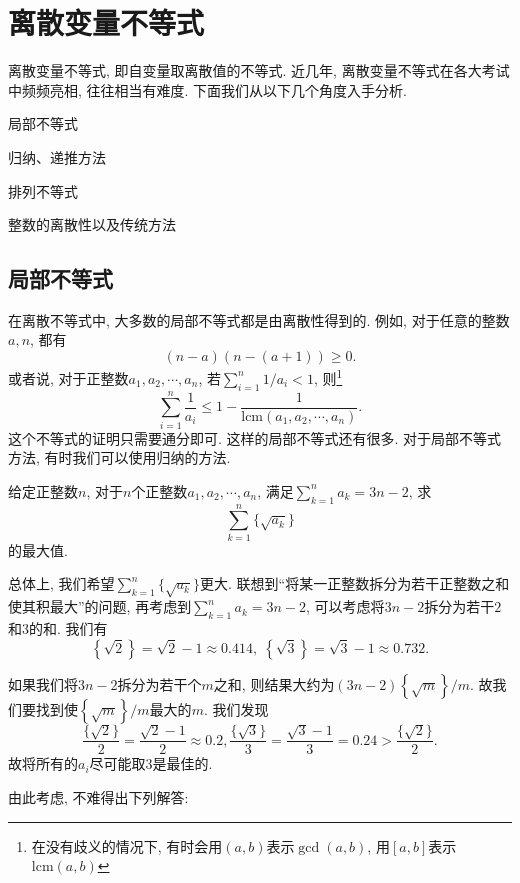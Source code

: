 \documentclass[lang=cn,12pt,thmcnt=section]{elegantbook}
\newcommand{\dec}[1]{\left\{#1\right\}}
\begin{document}
\chapter{离散变量不等式}

\setcounter{page}{1}

离散变量不等式, 即自变量取离散值的不等式. 近几年, 离散变量不等式在各大考试中频频亮相, 往往相当有难度. 下面我们从以下几个角度入手分析.

\begin{introduction}
\item 局部不等式
\item 归纳、递推方法
\item 排列不等式
\item 整数的离散性以及传统方法
\end{introduction}

\section{局部不等式}

在离散不等式中, 大多数的局部不等式都是由离散性得到的. 例如, 对于任意的整数$a, n$, 都有
\[ (n-a)(n-(a+1))\ge 0. \]
或者说, 对于正整数$a_1,a_2,\cdots,a_n$, 若$\sum_{i=1}^n 1/a_i<1$, 则\footnote{在没有歧义的情况下, 有时会用$(a,b)$表示$\gcd(a,b)$, 用$[a,b]$表示$\mathrm{lcm}(a,b)$}
\[\sum_{i=1}^n\frac{1}{a_i}\le1-\frac{1}{\mathrm{lcm}(a_1,a_2,\cdots,a_n)}.\]
这个不等式的证明只需要通分即可. 这样的局部不等式还有很多. 对于局部不等式方法, 有时我们可以使用归纳的方法.
\begin{example}
给定正整数$n$, 对于$n$个正整数$a_1,a_2,\cdots,a_n$, 满足$\sum_{k=1}^{n}a_k=3n-2$,  求
\[\sum_{k=1}^{n}\{\sqrt{a_{k}}\}\]
的最大值.
\end{example}

\begin{analysis}
总体上, 我们希望$\sum_{k=1}^{n}\{\sqrt{a_{k}}\}$更大. 联想到“将某一正整数拆分为若干正整数之和使其积最大”的问题, 再考虑到$\sum_{k=1}^{n}a_k=3n-2$, 可以考虑将$3n-2$拆分为若干$2$和$3$的和. 我们有
\[\dec{\sqrt{2}}=\sqrt{2}-1\approx0.414,\;\dec{\sqrt{3}}=\sqrt{3}-1\approx0.732.\]\par
如果我们将$3n-2$拆分为若干个$m$之和, 则结果大约为$(3n-2)\dec{\sqrt{m}}/m$. 故我们要找到使$\dec{\sqrt{m}}/m$最大的$m$. 我们发现
\[\frac{\{\sqrt{2}\}}{2}=\frac{\sqrt{2}-1}{2}\approx0.2,\frac{\{\sqrt{3}\}}{3}=\frac{\sqrt{3}-1}{3}=0.24>\frac{\{\sqrt{2}\}}{2}.\]
故将所有的$a_i$尽可能取$3$是最佳的.\par
由此考虑, 不难得出下列解答:
\end{analysis}
\end{document}
